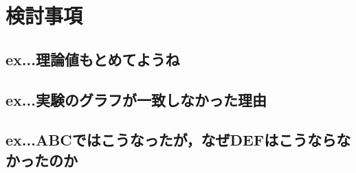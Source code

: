 \section{検討事項}
\subsection{ex...理論値もとめてようね}


\clearpage
\subsection{ex...実験のグラフが一致しなかった理由}
\clearpage
\subsection{ex...ABCではこうなったが，なぜDEFはこうならなかったのか}
